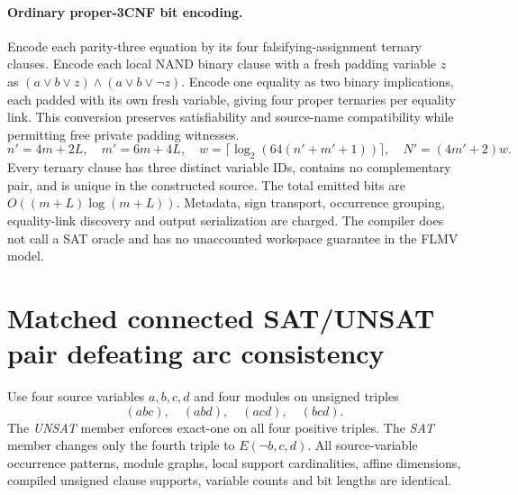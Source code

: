 \documentclass[11pt]{article}
\begin{document}
\paragraph{Ordinary proper-3CNF bit encoding.}
Encode each parity-three equation by its four falsifying-assignment ternary clauses. Encode each local NAND binary clause with a fresh padding variable \(z\) as \((a\vee b\vee z)\land(a\vee b\vee\neg z)\). Encode one equality as two binary implications, each padded with its own fresh variable, giving four proper ternaries per equality link. This conversion preserves satisfiability and source-name compatibility while permitting free private padding witnesses.
\begin{equation}
\boxed{
n'=4m+2L,\quad m'=6m+4L,\quad
w=\lceil\log_2(64(n'+m'+1))\rceil,\quad
N'=(4m'+2)w.}
\label{eq:counts}
\end{equation}
Every ternary clause has three distinct variable IDs, contains no complementary pair, and is unique in the constructed source. The total emitted bits are \(O((m+L)\log(m+L))\). Metadata, sign transport, occurrence grouping, equality-link discovery and output serialization are charged. The compiler does not call a SAT oracle and has no unaccounted workspace guarantee in the FLMV model.

\section{Matched connected SAT/UNSAT pair defeating arc consistency}
Use four source variables \(a,b,c,d\) and four modules on unsigned triples
\[
(abc),\quad(abd),\quad(acd),\quad(bcd).
\]
The \emph{UNSAT} member enforces exact-one on all four positive triples. The \emph{SAT} member changes only the fourth triple to \(E(\neg b,c,d)\). All source-variable occurrence patterns, module graphs, local support cardinalities, affine dimensions, compiled unsigned clause supports, variable counts and bit lengths are identical.
\end{document}
